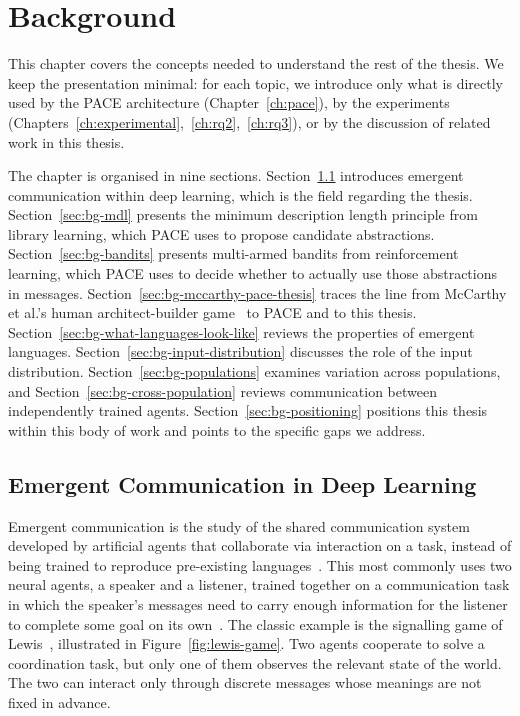\chapter{Background}
\label{ch:background}

This chapter covers the concepts needed to understand the rest of the thesis. We keep the presentation minimal: for each topic, we introduce only what is directly used by the PACE architecture (Chapter~\ref{ch:pace}), by the experiments (Chapters~\ref{ch:experimental},~\ref{ch:rq2},~\ref{ch:rq3}), or by the discussion of related work in this thesis.

The chapter is organised in nine sections. Section~\ref{sec:bg-ec-deep-learning} introduces emergent communication within deep learning, which is the field regarding the thesis. Section~\ref{sec:bg-mdl} presents the minimum description length principle from library learning, which PACE uses to propose candidate abstractions. Section~\ref{sec:bg-bandits} presents multi-armed bandits from reinforcement learning, which PACE uses to decide whether to actually use those abstractions in messages. Section~\ref{sec:bg-mccarthy-pace-thesis} traces the line from McCarthy et al.'s human architect-builder game~\cite{mccarthy_learning_2021} to PACE and to this thesis. Section~\ref{sec:bg-what-languages-look-like} reviews the properties of emergent languages. Section~\ref{sec:bg-input-distribution} discusses the role of the input distribution. Section~\ref{sec:bg-populations} examines variation across populations, and Section~\ref{sec:bg-cross-population} reviews communication between independently trained agents. Section~\ref{sec:bg-positioning} positions this thesis within this body of work and points to the specific gaps we address.

\section{Emergent Communication in Deep Learning}
\label{sec:bg-ec-deep-learning}

Emergent communication is the study of the shared communication system developed by artificial agents that collaborate via interaction on a task, instead of being trained to reproduce pre-existing languages~\cite{lazaridou_emergent_2020}. This most commonly uses two neural agents, a speaker and a listener, trained together on a communication task in which the speaker's messages need to carry enough information for the listener to complete some goal on its own~\cite{foerster_learning_2016}. The classic example is the signalling game of Lewis~\cite{lewis_convention_1969}, illustrated in Figure~\ref{fig:lewis-game}. Two agents cooperate to solve a coordination task, but only one of them observes the relevant state of the world. The two can interact only through discrete messages whose meanings are not fixed in advance.

